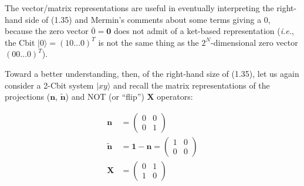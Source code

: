 \documentclass{article}
\begin{document}
The vector/matrix representations are useful in eventually interpreting the right-hand side of (1.35) and Mermin's comments about some terms giving a 0, because the zero vector $\overline{0} = \bm{0}$ does not admit of a ket-based representation (\textit{i.e.}, the Cbit $|0\rangle = (1 0 \ldots 0)^T$ is not the same thing as the $2^N$-dimensional zero vector $(0 0 \ldots 0)^T$).

\vspace{0.125in}

Toward a better understanding, then, of the right-hand size of (1.35), let us again consider a 2-Cbit system $|xy\rangle$ and recall the matrix representations of the projections ($\bm{n}$, $\bm{\widetilde{n}}$) and NOT (or ``flip'') $\bm{X}$ operators:

\begin{align*}
\bm{n} &= \begin{pmatrix}0 & 0\\0 & 1\end{pmatrix}\\
\bm{\widetilde{n}} &= \bm{1} - \bm{n} = \begin{pmatrix}1 & 0\\0 & 0\end{pmatrix}\\
\bm{X} &= \begin{pmatrix}0 & 1\\1 & 0\end{pmatrix}
\end{align*}
\end{document}
